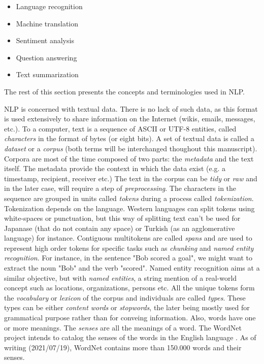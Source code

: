 \begin{itemize}
    \item Language recognition
    \item Machine translation
    \item Sentiment analysis
    \item Question answering
    \item Text summarization
\end{itemize}
The rest of this section presents the concepts and terminologies used in NLP.

NLP is concerned with textual data.
There is no lack of such data, as this format is used extensively to share information on the Internet (wikis, emails, messages, etc.).
To a computer, text is a sequence of ASCII or UTF-8 entities, called \emph{characters} in the format of bytes (or eight bits).
A set of textual data is called a \emph{dataset} or a \emph{corpus} (both terms will be interchanged thoughout this manuscript).
Corpora are most of the time composed of two parts: the \emph{metadata} and the text itself.
The metadata provide the context in which the data exist (e.g. a timestamp, recipient, receiver etc.)
The text in the corpus can be \emph{tidy} or \emph{raw} and in the later case, will require a step of \emph{preprocessing}.
The characters in the sequence are grouped in units called \emph{tokens} during a process called \emph{tokenization}.
Tokenization depends on the language.
Western languages can split tokens using white-spaces or punctuation, but this way of splitting text can't be used for Japanase (that do not contain any space) or Turkish (as an agglomerative language) for instance.
Contiguous multitokens are called \emph{spans} and are used to represent high order tokens for specific tasks such as \emph{chunking} and \emph{named entity recognition}.
For instance, in the sentence "Bob scored a goal", we might want to extract the noun "Bob" and the verb "scored".
Named entity recognition aims at a similar objective, but with \emph{named entities}, a string mention of a real-world concept such as locations, organizations, persons etc.
All the unique tokens form the \emph{vocabulary} or \emph{lexicon} of the corpus and individuals are called \emph{types}.
These types can be either \emph{content words} or \emph{stopwords}, the later being mostly used for grammatical purpose rather than for conveing information.
Also, words have one or more meanings.
The \emph{senses} are all the meanings of a word.
The WordNet project intends to catalog the senses of the words in the English language \cite{millerWordNetLexicalDatabase1995}.
As of writing (2021/07/19), WordNet contains more than 150.000 words and their senses.

